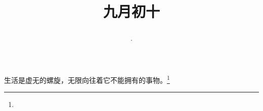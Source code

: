 \title{\date[d=12,m=10,y=2024][year:cn-y,年,month:cn,day:cn,日,·,weekday]·九月初十 }
生活是虚无的螺旋，无限向往着它不能拥有的事物。\footnote{ }

